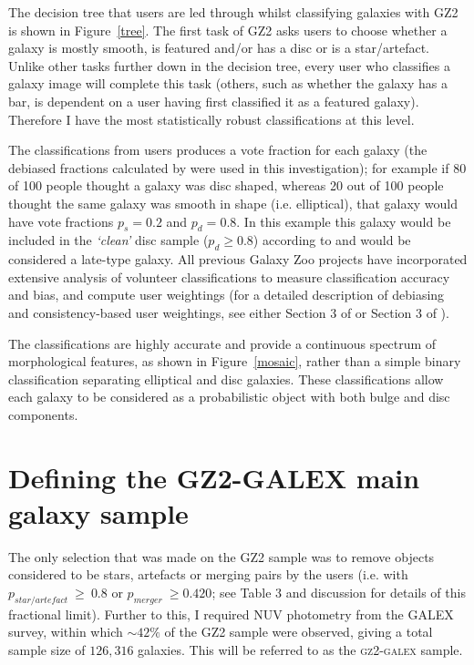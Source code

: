 The decision tree that users are led through whilst classifying galaxies with GZ2 is shown in Figure~\ref{tree}. The first task of GZ2 asks users to choose whether a galaxy is mostly smooth, is featured and/or has a disc or is a star/artefact. Unlike other tasks further down in the decision tree, every user who classifies a galaxy image will complete this task (others, such as whether the galaxy has a bar, is dependent on a user having first classified it as a featured galaxy). Therefore I have the most statistically robust classifications at this level.

The classifications from users produces a vote fraction for each galaxy (the debiased fractions calculated by \citet{GZ2} were used in this investigation); for example if 80 of 100 people thought a galaxy was disc shaped, whereas 20 out of 100 people thought the same galaxy was smooth in shape (i.e. elliptical), that galaxy would have vote fractions $p_{s} = 0.2$ and $p_{d} = 0.8$. In this example this galaxy would be included in the \emph{`clean'} disc sample ($p_d \geq 0.8$) according to \cite{GZ2} and would be considered a late-type galaxy. All previous Galaxy Zoo projects have incorporated extensive analysis of volunteer classifications to measure classification accuracy and bias, and compute user weightings (for a detailed description of debiasing and consistency-based user weightings, see either Section 3 of \citealt{Lintott09} or Section 3 of \citealt{GZ2}). 


The classifications are highly accurate and provide a continuous spectrum of morphological features, as shown in Figure~\ref{mosaic}, rather than a simple binary classification separating elliptical and disc galaxies. These classifications allow each galaxy to be considered as a probabilistic object with both bulge and disc components. 

\section{Defining the GZ2-GALEX main galaxy sample}\label{sec:defsample}

The only selection that was made on the GZ2 sample was to remove objects considered to be stars, artefacts or merging pairs by the users (i.e. with $p_{star/artefact} ~\geq~ 0.8$ or $p_{merger} ~\geq 0.420$; see \citealt{GZ2} Table 3 and discussion for details of this fractional limit). Further to this, I required NUV photometry from the GALEX survey, within which $\sim42\%$ of the GZ2 sample were observed, giving a total sample size of $126, 316$ galaxies. This will be referred to as the \textsc{gz2-galex} sample. 

